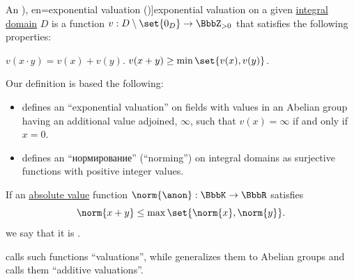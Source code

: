 \begin{definition}\label{def:exponential_valuation}
  An \term[ru=нормирование (\cite[437]{Винберг2014КурсАлгебры}), en=exponential valuation (\cite[def. 9.4']{Jacobson1989BasicAlgebraII})]{exponential valuation} on a given \hyperref[def:integral_domain]{integral domain} \( D \) is a function \( v: D \setminus \set{ 0_D } \to \BbbZ_{>0} \) that satisfies the following properties:
  \begin{thmenum}
     \( v(x \cdot y) = v(x) + v(y) \).
     \( v(x + y) \geq \min\set{ v(x), v(y) } \).
  \end{thmenum}
\end{definition}
\begin{comments}
  \item Our definition is based the following:
  \begin{itemize}
    \item \Textcite[def. 9.4']{Jacobson1989BasicAlgebraII} defines an \enquote{exponential valuation} on fields with values in an Abelian group having an additional value adjoined, \( \infty \), such that \( v(x) = \infty \) if and only if \( x = 0 \).

    \item \Textcite{Винберг2014КурсАлгебры} defines an \enquote{нормирование} (\enquote{norming}) on integral domains as surjective functions with positive integer values.
  \end{itemize}
\end{comments}

\begin{definition}\label{def:non_archimedean_absolute_value}
  If an \hyperref[def:absolute_value]{absolute value} function \( \norm{\anon}: \BbbK \to \BbbR \) satisfies
  \begin{equation}\label{eq:def:non_archimedean_absolute_value}
    \norm{x + y} \leq \max\set{ \norm{x}, \norm{y} }.
  \end{equation}
  we say that it is .
\end{definition}
\begin{comments}
  \item \Textcite[465]{Lang2002Algebra} calls such functions \enquote{valuations}, while \cite[def. 9.4']{Jacobson1989BasicAlgebraII} generalizes them to Abelian groups and calls them \enquote{additive valuations}.
\end{comments}

